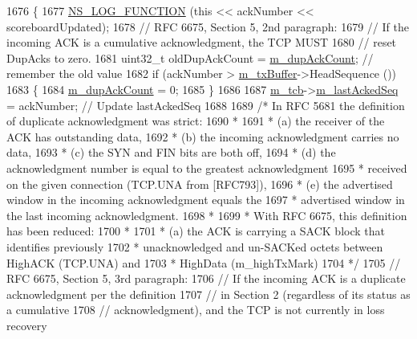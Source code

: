 \begin{DoxyCode}
1676 \{
1677   \hyperlink{log-macros-disabled_8h_a90b90d5bad1f39cb1b64923ea94c0761}{NS\_LOG\_FUNCTION} (\textcolor{keyword}{this} << ackNumber << scoreboardUpdated);
1678   \textcolor{comment}{// RFC 6675, Section 5, 2nd paragraph:}
1679   \textcolor{comment}{// If the incoming ACK is a cumulative acknowledgment, the TCP MUST}
1680   \textcolor{comment}{// reset DupAcks to zero.}
1681   uint32\_t oldDupAckCount = \hyperlink{classns3_1_1TcpSocketBase_a4cf1d54115a5b2c8db34b62b6ccfa541}{m\_dupAckCount}; \textcolor{comment}{// remember the old value}
1682   \textcolor{keywordflow}{if} (ackNumber > \hyperlink{classns3_1_1TcpSocketBase_a4a1b53982ffd851bd07ab8d5005c130e}{m\_txBuffer}->HeadSequence ())
1683     \{
1684       \hyperlink{classns3_1_1TcpSocketBase_a4cf1d54115a5b2c8db34b62b6ccfa541}{m\_dupAckCount} = 0;
1685     \}
1686 
1687   \hyperlink{classns3_1_1TcpSocketBase_a26bbaf59001308dc43fb630d76f2e38b}{m\_tcb}->\hyperlink{classns3_1_1TcpSocketState_a7a30ba2b675238429c7fe2f0c8d1ce94}{m\_lastAckedSeq} = ackNumber; \textcolor{comment}{// Update lastAckedSeq}
1688 
1689   \textcolor{comment}{/* In RFC 5681 the definition of duplicate acknowledgment was strict:}
1690 \textcolor{comment}{   *}
1691 \textcolor{comment}{   * (a) the receiver of the ACK has outstanding data,}
1692 \textcolor{comment}{   * (b) the incoming acknowledgment carries no data,}
1693 \textcolor{comment}{   * (c) the SYN and FIN bits are both off,}
1694 \textcolor{comment}{   * (d) the acknowledgment number is equal to the greatest acknowledgment}
1695 \textcolor{comment}{   *     received on the given connection (TCP.UNA from [RFC793]),}
1696 \textcolor{comment}{   * (e) the advertised window in the incoming acknowledgment equals the}
1697 \textcolor{comment}{   *     advertised window in the last incoming acknowledgment.}
1698 \textcolor{comment}{   *}
1699 \textcolor{comment}{   * With RFC 6675, this definition has been reduced:}
1700 \textcolor{comment}{   *}
1701 \textcolor{comment}{   * (a) the ACK is carrying a SACK block that identifies previously}
1702 \textcolor{comment}{   *     unacknowledged and un-SACKed octets between HighACK (TCP.UNA) and}
1703 \textcolor{comment}{   *     HighData (m\_highTxMark)}
1704 \textcolor{comment}{   */}
1705   \textcolor{comment}{// RFC 6675, Section 5, 3rd paragraph:}
1706   \textcolor{comment}{// If the incoming ACK is a duplicate acknowledgment per the definition}
1707   \textcolor{comment}{// in Section 2 (regardless of its status as a cumulative}
1708   \textcolor{comment}{// acknowledgment), and the TCP is not currently in loss recovery}

\end{DoxyCode}
